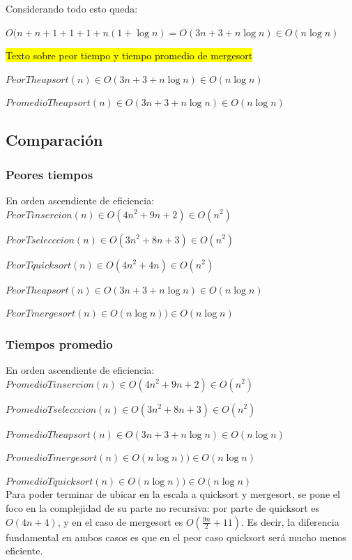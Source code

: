 \documentclass[article,a4paper]{article}
\begin{document}
Considerando todo esto queda: 

$O( n + n +1 + 1 +1+n(1 + \log n  ) = O(3n + 3 + n \log n ) \in O(n \log n)$ 

\hl{Texto sobre peor tiempo y tiempo promedio de mergesort}

$PeorTheapsort(n)  \in O(3n + 3 + n \log n) \in O(n \log n)$

$PromedioTheapsort(n) \in O(3n + 3 +n \log n) \in O(n \log n)$ 

\subsection{Comparación}

\subsubsection{Peores tiempos}

En orden ascendiente de eficiencia:\\

$PeorTinsercion(n) \in O(4n^2 + 9n + 2) \in O(n^2)$

$PeorTselecccion(n) \in O(3n^2 + 8n + 3) \in O(n^2)$ 

$PeorTquicksort(n) \in O(4n^2 + 4n) \in O(n^2)$

$PeorTheapsort(n)  \in O(3n + 3 +n \log n) \in O(n \log n)$

$PeorTmergesort(n) \in O(n \log n)) \in O(n \log n)$

\subsubsection{Tiempos promedio}

En orden ascendiente de eficiencia:\\

$PromedioTinsercion(n) \in O(4n^2 + 9n + 2) \in O(n^2)$

$PromedioTselecccion(n)  \in O(3n^2 + 8n + 3) \in O(n^2)$

$PromedioTheapsort(n) \in O(3n + 3 +n \log n) \in O(n \log n)$ 

$PromedioTmergesort(n) \in O(n \log n)) \in O(n \log n)$

$PromedioTquicksort(n) \in O(n \log n)) \in O(n \log n)$\\

Para poder terminar de ubicar en la escala a quicksort y mergesort, se pone el foco en la complejidad de su parte no recursiva: por parte de quicksort es $O(4n + 4)$, y en el caso de mergesort es $O( \frac{9n}{2} +11 )$. Es decir, la diferencia fundamental en ambos casos es que en el peor caso quicksort será mucho menos eficiente.
\end{document}
